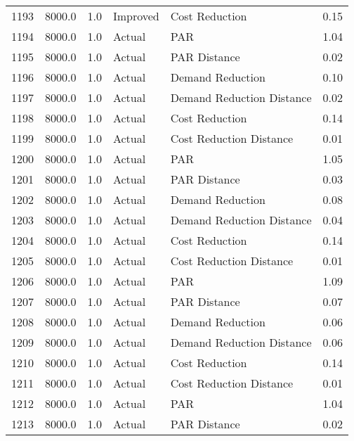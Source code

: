 \begin{longtable}{lrrllr}
1193 &       8000.0 &     1.0 &       Improved &             Cost Reduction &   0.15 \\
1194 &       8000.0 &     1.0 &         Actual &                        PAR &   1.04 \\
1195 &       8000.0 &     1.0 &         Actual &               PAR Distance &   0.02 \\
1196 &       8000.0 &     1.0 &         Actual &           Demand Reduction &   0.10 \\
1197 &       8000.0 &     1.0 &         Actual &  Demand Reduction Distance &   0.02 \\
1198 &       8000.0 &     1.0 &         Actual &             Cost Reduction &   0.14 \\
1199 &       8000.0 &     1.0 &         Actual &    Cost Reduction Distance &   0.01 \\
1200 &       8000.0 &     1.0 &         Actual &                        PAR &   1.05 \\
1201 &       8000.0 &     1.0 &         Actual &               PAR Distance &   0.03 \\
1202 &       8000.0 &     1.0 &         Actual &           Demand Reduction &   0.08 \\
1203 &       8000.0 &     1.0 &         Actual &  Demand Reduction Distance &   0.04 \\
1204 &       8000.0 &     1.0 &         Actual &             Cost Reduction &   0.14 \\
1205 &       8000.0 &     1.0 &         Actual &    Cost Reduction Distance &   0.01 \\
1206 &       8000.0 &     1.0 &         Actual &                        PAR &   1.09 \\
1207 &       8000.0 &     1.0 &         Actual &               PAR Distance &   0.07 \\
1208 &       8000.0 &     1.0 &         Actual &           Demand Reduction &   0.06 \\
1209 &       8000.0 &     1.0 &         Actual &  Demand Reduction Distance &   0.06 \\
1210 &       8000.0 &     1.0 &         Actual &             Cost Reduction &   0.14 \\
1211 &       8000.0 &     1.0 &         Actual &    Cost Reduction Distance &   0.01 \\
1212 &       8000.0 &     1.0 &         Actual &                        PAR &   1.04 \\
1213 &       8000.0 &     1.0 &         Actual &               PAR Distance &   0.02 \\

\end{longtable}
